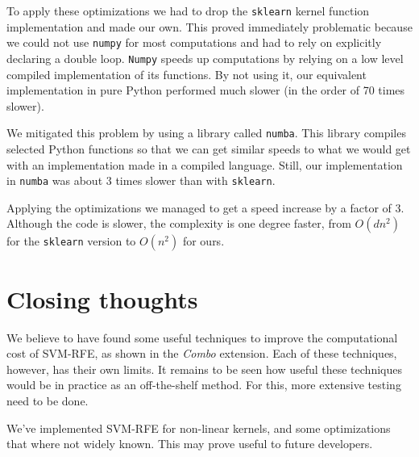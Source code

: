 To apply these optimizations we had to drop the \texttt{sklearn} kernel function im\-ple\-men\-ta\-tion and made our own. This proved immediately problematic because we could not use \texttt{numpy} for most computations and had to rely on explicitly declaring a double loop. \texttt{Numpy} speeds up computations by relying on a low level compiled implementation of its functions. By not using it, our equivalent implementation in pure Python performed much slower (in the order of 70 times slower).

We mitigated this problem by using a library called \texttt{numba}. This library compiles selected Python functions so that we can get similar speeds to what we would get with an implementation made in a compiled language. Still, our implementation in \texttt{numba} was about 3 times slower than with \texttt{sklearn}.

Applying the optimizations we managed to get a speed increase by a factor of 3. Although the code is slower, the complexity is one degree faster, from $O(dn^2)$ for the \texttt{sklearn} version to $O(n^2)$ for ours.

\section{Closing thoughts}

We believe to have found some useful techniques to improve the computational cost of SVM-RFE, as shown in the \emph{Combo} extension. Each of these techniques, however, has their own limits. It remains to be seen how useful these techniques would be in practice as an off-the-shelf method. For this, more extensive testing need to be done.

We've implemented SVM-RFE for non-linear kernels, and some optimizations that where not widely known. This may prove useful to future developers.
